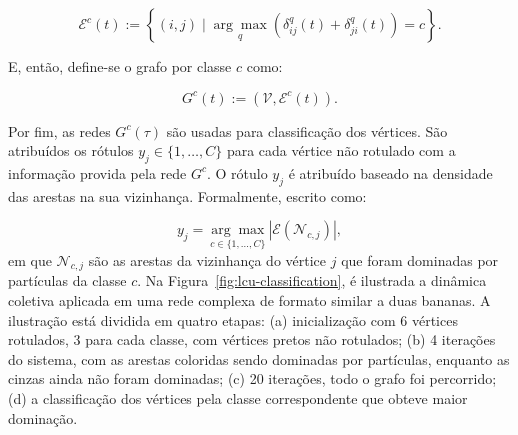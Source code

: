 \begin{equation}\label{eq:lcu-edges-by-class}
  \mathcal{E}^c(t):=\left\{(i, j) \mid \underset{q}{\arg \max }\left(\delta_{i j}^q(t)+\delta_{j i}^q(t)\right)=c\right\}.
\end{equation}

E, então, define-se o grafo por classe $c$ como:

\begin{equation}\label{eq:lcu-subnetworks}
  G^c(t):=\left(\mathcal{V}, \mathcal{E}^c(t)\right).
\end{equation}

Por fim, as redes $ G^c(\tau) $ são usadas para classificação dos
vértices. São atribuídos os rótulos $y_j \in \{1, \ldots, C\}$ para cada
vértice não rotulado com a informação provida pela rede $G^c$.  O
rótulo $y_j$ é atribuído baseado na densidade das arestas na sua
vizinhança. Formalmente, escrito como:

\begin{equation}\label{eq:lcu-vertex-classification}
y_j = \underset{c \in \{1, \ldots, C\}}{\arg \max }\left| \mathcal{E}(\mathcal{N}_{c,j}) \right|,
\end{equation}
\noindent
em que ${\mathcal{N}_{c,j}}$ são as arestas da vizinhança do vértice $j$ que
foram dominadas por partículas da classe $c$. Na
Figura~\ref{fig:lcu-classification}, é ilustrada a dinâmica coletiva
aplicada em uma rede complexa de formato similar a duas bananas. A
ilustração está dividida em quatro etapas: (a) inicialização com 6
vértices rotulados, 3 para cada classe, com vértices pretos não
rotulados; (b) 4 iterações do sistema, com as arestas coloridas
sendo dominadas por partículas, enquanto as cinzas ainda não foram
dominadas; (c) 20 iterações, todo o grafo foi percorrido; (d) a
classificação dos vértices pela classe correspondente que obteve maior
dominação.

